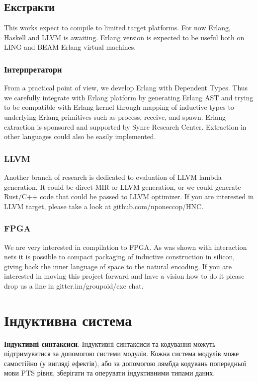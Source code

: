 \subsection{Екстракти}

This works expect to compile to limited target platforms. For now Erlang, Haskell and LLVM is awaiting.
Erlang version is expected to be useful both on LING and BEAM Erlang virtual machines.

\subsubsection{Інтерпретатори}

From a practical point of view, we develop Erlang with Dependent Types.
Thus we carefully integrate with Erlang platform by generating Erlang
AST and trying to be compatible with Erlang kernel through mapping of
inductive types to underlying Erlang primitives such as process,
receive, and spawn. Erlang extraction is sponsored and supported
by Synrc Research Center. Extraction in other languages could also be easily implemented.

\subsubsection{LLVM}

Another branch of research is dedicated to evaluation of LLVM lambda generation. It could be direct MIR or LLVM generation, or we could generate Rust/C++ code that could be passed to LLVM optimizer. If you are interested in LLVM target, please take a look at github.com/nponeccop/HNC.

\subsubsection{FPGA}

We are very interested in compilation to FPGA. As was shown with interaction nets it is possible to compact packaging of inductive construction in silicon, giving back the inner language of space to the natural encoding. If you are interested in moving this project forward and have a vision how to do it please drop us a line in gitter.im/groupoid/exe chat.

\section{Індуктивна система}

{\bf Індуктивні синтаксиси}. Індуктивні синтаксиси та кодування можуть підтримуватися за допомогою системи модулів.
Кожна система модулів може самостійно (у вигляді ефектів), або за допомогою лямбда кодувань
попередньої мови PTS рівня, зберігати та оперувати індуктивними типами даних.

